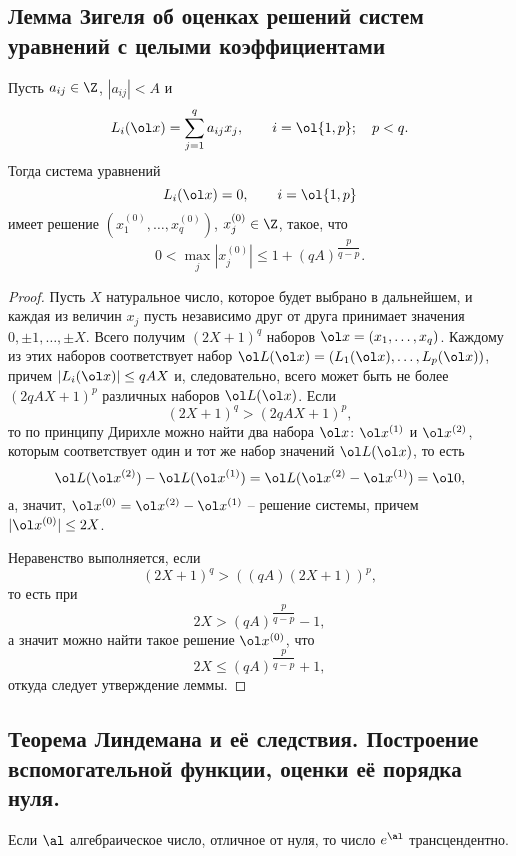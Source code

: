 \documentclass{article}
\begin{document}
\subsection{Лемма Зигеля об оценках решений систем уравнений с целыми коэффициентами}

\begin{lemma}
Пусть $a_{ij} \in \Z$, $|a_{ij}| < A$  и
$$
L_i(\ol x)= \sum_{j=1}^q a_{ij}x_j, \qquad  i= \ol {1,p}; \quad p<q.
$$
Тогда система уравнений
$$
L_i(\ol x)=0, \qquad i= \ol {1,p}
$$
имеет решение $(x_1^{(0)}, \dots, x_q^{(0)})$, $x_j^{(0)} \in \Z$,
такое, что
$$
0< \max_j |x_j^{(0)}| \le 1 + (qA)^{\dfrac p{q-p}}.
$$
\end{lemma}

\begin{proof}
Пусть $X$  натуральное число, которое будет выбрано
в дальнейшем, и каждая из величин $x_j$
пусть независимо друг от друга принимает
значения $0, \pm 1, \dots, \pm X.$ Всего получим $(2X+1)^q$ наборов
$\ol x=(x_1, \dots, x_q)$. Каждому из этих наборов соответствует набор
$\ol L(\ol x) = (L_1(\ol x ), \dots, L_p ( \ol x ))$, причем
$|L_i(\ol x )| \le qAX$  и, следовательно, всего может быть не более
$(2qAX+1)^p$ различных наборов   $\ol L ( \ol x )$.   Если
\begin{equation}[2]
(2X+1)^q > (2qAX+1)^p,
\end{equation}
то по принципу Дирихле можно найти два  набора  $\ol x$: $\ol x^{(1)}$
и $\ol x^{(2)}$, которым соответствует
один и тот же набор значений $\ol L (\ol x)$, то есть
$$
\ol L (\ol x^{(2)}) - \ol L (\ol x^{(1)}) = \ol L (\ol x^{(2)}- \ol x^{(1)})
= \ol 0,
$$
а, значит, $\ol x^{(0)} = \ol x^{(2)}- \ol x^{(1)}  $
-- решение системы, причем $|\ol x^{(0)}| \le 2X$.

Неравенство    выполняется, если
$$
(2X+1)^q > ((qA)(2X+1))^p,
$$
то есть при
$$
2X > (qA)^{\dfrac p{q-p}} -1,
$$
а значит можно найти такое решение $\ol x^{(0)}$, что
$$
2X \le (qA)^{\dfrac p{q-p}} +1,
$$
откуда следует утверждение леммы.
\end{proof}

\subsection{Теорема Линдемана и её следствия. Построение вспомогательной функции, оценки её порядка нуля.}

\begin{theorem}[Линдеман] Если  $\al$   алгебраическое
число, отличное от нуля, то число $e^{\al}$ трансцендентно.
\end{theorem}
\end{document}
